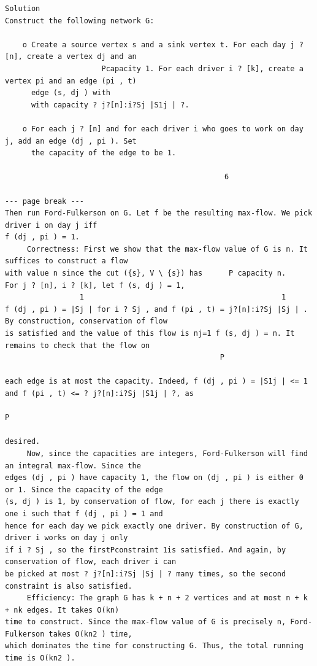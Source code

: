\documentclass[12pt]{article}
\begin{document}
\begin{Verbatim}[breaklines=true,fontsize=\small]
Solution
Construct the following network G:

    o Create a source vertex s and a sink vertex t. For each day j ? [n], create a vertex dj and an
                      Pcapacity 1. For each driver i ? [k], create a vertex pi and an edge (pi , t)
      edge (s, dj ) with
      with capacity ? j?[n]:i?Sj |S1j | ?.

    o For each j ? [n] and for each driver i who goes to work on day j, add an edge (dj , pi ). Set
      the capacity of the edge to be 1.

                                                  6

--- page break ---
Then run Ford-Fulkerson on G. Let f be the resulting max-flow. We pick driver i on day j iff
f (dj , pi ) = 1.
     Correctness: First we show that the max-flow value of G is n. It suffices to construct a flow
with value n since the cut ({s}, V \ {s}) has      P capacity n.     For j ? [n], i ? [k], let f (s, dj ) = 1,
                 1                                             1
f (dj , pi ) = |Sj | for i ? Sj , and f (pi , t) = j?[n]:i?Sj |Sj | . By construction, conservation of flow
is satisfied and the value of this flow is nj=1 f (s, dj ) = n. It remains to check that the flow on
                                                 P

each edge is at most the capacity. Indeed, f (dj , pi ) = |S1j | <= 1 and f (pi , t) <= ? j?[n]:i?Sj |S1j | ?, as
                                                                                        P

desired.
     Now, since the capacities are integers, Ford-Fulkerson will find an integral max-flow. Since the
edges (dj , pi ) have capacity 1, the flow on (dj , pi ) is either 0 or 1. Since the capacity of the edge
(s, dj ) is 1, by conservation of flow, for each j there is exactly one i such that f (dj , pi ) = 1 and
hence for each day we pick exactly one driver. By construction of G, driver i works on day j only
if i ? Sj , so the firstPconstraint 1is satisfied. And again, by conservation of flow, each driver i can
be picked at most ? j?[n]:i?Sj |Sj | ? many times, so the second constraint is also satisfied.
     Efficiency: The graph G has k + n + 2 vertices and at most n + k + nk edges. It takes O(kn)
time to construct. Since the max-flow value of G is precisely n, Ford-Fulkerson takes O(kn2 ) time,
which dominates the time for constructing G. Thus, the total running time is O(kn2 ).





\end{Verbatim}
\end{document}
